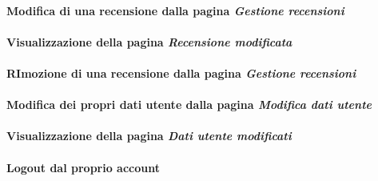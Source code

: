 \paragraph{Modifica di una recensione dalla pagina \textit{Gestione recensioni}}
\label{analisi-casi-uso-attori-principali-utente-autenticato-5}

\paragraph{Visualizzazione della pagina \textit{Recensione modificata}}
\label{analisi-casi-uso-attori-principali-utente-autenticato-6}

\paragraph{RImozione di una recensione dalla pagina \textit{Gestione recensioni}}
\label{analisi-casi-uso-attori-principali-utente-autenticato-7}

\paragraph{Modifica dei propri dati utente dalla pagina \textit{Modifica dati utente}}
\label{analisi-casi-uso-attori-principali-utente-autenticato-8}

\paragraph{Visualizzazione della pagina \textit{Dati utente modificati}}
\label{analisi-casi-uso-attori-principali-utente-autenticato-9}

\paragraph{Logout dal proprio account}
\label{analisi-casi-uso-attori-principali-utente-autenticato-10}


